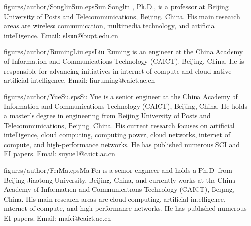 \documentclass{ccjnl}
\begin{document}
\begin{CCJNLbiography}{figures/author/SonglinSun.eps}{Sun Songlin}
	, Ph.D., is a professor at Beijing University of Posts and Telecommunications, Beijing, China. His main research areas are wireless communication, multimedia technology, and artificial intelligence. Email: slsun@bupt.edu.cn
\end{CCJNLbiography}

\begin{CCJNLbiography}{figures/author/RumingLiu.eps}{Liu Ruming}
	is an engineer at the China Academy of Information and Communications Technology (CAICT), Beijing, China. He is responsible for advancing initiatives in internet of compute and cloud-native artificial intelligence. Email: liuruming@caict.ac.cn
\end{CCJNLbiography}

\begin{CCJNLbiography}{figures/author/YueSu.eps}{Su Yue}
	is a senior engineer at the China Academy of Information and Communications Technology (CAICT), Beijing, China. He holds a master's degree in engineering from Beijing University of Posts and Telecommunications, Beijing, China. His current research focuses on artificial intelligence, cloud computing, computing power, cloud networks, internet of compute, and high-performance networks. He has published numerous SCI and EI papers. Email: suyue1@caict.ac.cn
\end{CCJNLbiography}

\begin{CCJNLbiography}{figures/author/FeiMa.eps}{Ma Fei}
	is a senior engineer and holds a Ph.D. from Beijing Jiaotong University, Beijing, China, and currently works at the China Academy of Information and Communications Technology (CAICT), Beijing, China. His main research areas are cloud computing, artificial intelligence, internet of compute, and high-performance networks. He has published numerous EI papers. Email: mafei@caict.ac.cn
\end{CCJNLbiography}
\end{document}
